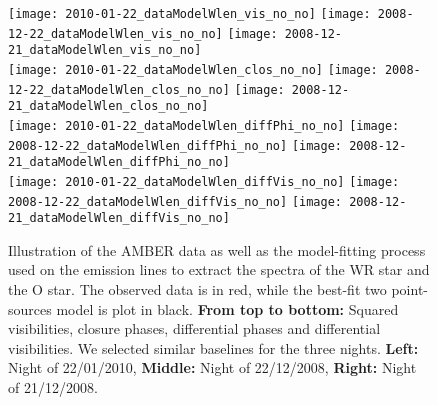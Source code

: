 \documentclass[usenatbib]{mnras}%
\begin{document}
 \begin{figure*}
   \centering
 \texttt{[image: 2010-01-22\_dataModelWlen\_vis\_no\_no]}
 \texttt{[image: 2008-12-22\_dataModelWlen\_vis\_no\_no]}
 \texttt{[image: 2008-12-21\_dataModelWlen\_vis\_no\_no]}\\
 \vspace{0.2cm}
 \texttt{[image: 2010-01-22\_dataModelWlen\_clos\_no\_no]}
 \texttt{[image: 2008-12-22\_dataModelWlen\_clos\_no\_no]}
 \texttt{[image: 2008-12-21\_dataModelWlen\_clos\_no\_no]}\\
 \vspace{0.2cm}
 \texttt{[image: 2010-01-22\_dataModelWlen\_diffPhi\_no\_no]}
 \texttt{[image: 2008-12-22\_dataModelWlen\_diffPhi\_no\_no]}
 \texttt{[image: 2008-12-21\_dataModelWlen\_diffPhi\_no\_no]}\\
 \vspace{0.2cm}
 \texttt{[image: 2010-01-22\_dataModelWlen\_diffVis\_no\_no]}
 \texttt{[image: 2008-12-22\_dataModelWlen\_diffVis\_no\_no]}
 \texttt{[image: 2008-12-21\_dataModelWlen\_diffVis\_no\_no]}
  \caption{Illustration of the AMBER data as well as the model-fitting process used on the emission lines to extract the spectra of the WR star and the O star. The observed data is in red, while the best-fit two point-sources model is plot in black. {\bf From top to bottom:} Squared visibilities, closure phases, differential phases and differential visibilities. We selected similar baselines for the three nights. {\bf Left:} Night of 22/01/2010,  {\bf Middle:} Night of 22/12/2008, {\bf Right:} Night of 21/12/2008.} 
  \label{fig:modelfit_lines}
 \end{figure*}

   
\end{document}
